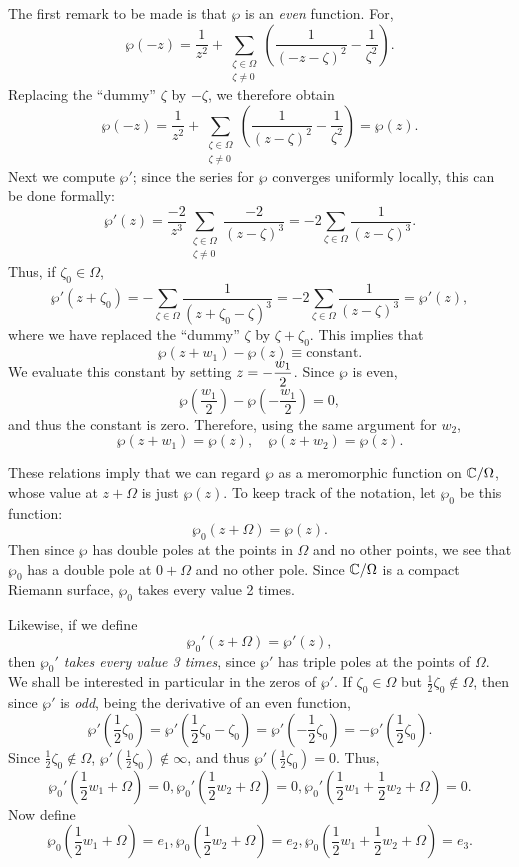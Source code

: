 \documentclass[a4paper,11pt]{article}
\begin{document}
\begin{mdframed}
  The first remark to be made is that $\wp$ is an \emph{even}
  function.  For,
  $$
  \wp(-z) = \frac{1}{z^2} + \sum_{\substack{\zeta \in \Omega\\ \zeta
      \ne 0}} (\frac{1}{(-z-\zeta)^2} - \frac{1}{\zeta^2}).
  $$
  Replacing the ``dummy'' $\zeta$ by $-\zeta$, we therefore obtain
  $$
  \wp(-z) = \frac{1}{z^2} + \sum_{\substack{\zeta \in \Omega\\ \zeta
      \ne 0}} (\frac{1}{(z-\zeta)^2} - \frac{1}{\zeta^2}) = \wp(z).
  $$
  Next we compute $\wp'$; since the series for $\wp$ converges
  uniformly locally, this can be done formally:
  $$
  \wp'(z) = \frac{-2}{z^3}\sum_{\substack{\zeta \in \Omega\\ \zeta
      \ne 0}} \frac{-2}{(z-\zeta)^3}
  = -2 \sum_{\zeta \in \Omega} \frac{1}{(z-\zeta)^3}.
  $$
  Thus, if $\zeta_0 \in \Omega$,
  $$
  \wp'(z + \zeta_0) = - \sum_{\zeta \in \Omega} \frac{1}{(z+\zeta_0 -
    \zeta)^3} = -2 \sum_{\zeta\in \Omega} \frac{1}{(z-\zeta)^3} =
  \wp'(z),
  $$
  where we have replaced the ``dummy'' $\zeta$ by $\zeta + \zeta_0$.
  This implies that
  $$
  \wp(z + w_1) - \wp(z) \equiv \text{constant}.
  $$
  We evaluate this constant by setting $\displaystyle z = -\frac{w_1}{2}$.
  Since $\wp$ is even,
  $$
  \wp(\frac{w_1}{2}) - \wp(-\frac{w_1}{2}) = 0,
  $$
  and thus the constant is zero.  Therefore, using the same argument
  for $w_2$,
  $$
  \wp(z + w_1) = \wp(z),\quad
  \wp(z + w_2) = \wp(z).
  $$

  These relations imply that we can regard $\wp$ as a meromorphic
  function on ${\mathbb C}/\Omega$, whose value at $z + \Omega$ is just
  $\wp(z)$.  To keep track of the notation, let $\wp_0$ be this
  function:
  $$
  \wp_0(z + \Omega) = \wp(z).
  $$
  Then since $\wp$ has double poles at the points in $\Omega$ and no
  other points, we see that $\wp_0$ has a double pole at $0 + \Omega$
  and no other pole.  Since ${\mathbb C} / \Omega$ is a compact Riemann 
  surface, $\wp_0$ takes every value 2 times.

  Likewise, if we define
  $$
  \wp_0'(z + \Omega) = \wp'(z),
  $$
  then \emph{$\wp_0'$ takes every value 3 times}, since $\wp'$ has
  triple poles at the points of $\Omega$.  We shall be interested in
  particular in the zeros of $\wp'$.  If $\zeta_0 \in \Omega$ but
  $\frac{1}{2} \zeta_0 \notin \Omega$, then since $\wp'$ is
  \emph{odd}, being the derivative of an even function,
  $$
  \wp'(\frac{1}{2}\zeta_0) 
  = \wp'(\frac{1}{2}\zeta_0 - \zeta_0)
  = \wp'(-\frac{1}{2}\zeta_0)
  = - \wp'(\frac{1}{2}\zeta_0).
  $$
  Since $\frac{1}{2}\zeta_0 \notin \Omega$, $\wp'(\frac{1}{2}\zeta_0)
  \notin \infty$, and thus $\wp'(\frac{1}{2}\zeta_0) = 0$.  Thus,
  $$
  \wp_0'(\frac{1}{2}w_1 + \Omega) = 0,
  \wp_0'(\frac{1}{2}w_2 + \Omega) = 0,
  \wp_0'(\frac{1}{2}w_1 + \frac{1}{2}w_2 + \Omega) = 0.
  $$
  Now define
  $$
  \wp_0(\frac{1}{2}w_1 + \Omega) = e_1,
  \wp_0(\frac{1}{2}w_2 + \Omega) = e_2,
  \wp_0(\frac{1}{2}w_1 + \frac{1}{2}w_2 + \Omega) = e_3.
  $$


\end{mdframed}
\end{document}

